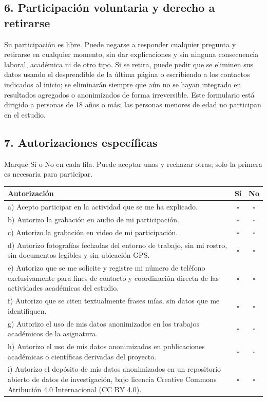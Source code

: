 \subsection*{6. Participación voluntaria y derecho a retirarse}

Su participación es libre. Puede negarse a responder cualquier pregunta y retirarse en cualquier momento, sin dar explicaciones y sin ninguna consecuencia laboral, académica ni de otro tipo. Si se retira, puede pedir que se eliminen sus datos usando el desprendible de la última página o escribiendo a los contactos indicados al inicio; se eliminarán siempre que aún no se hayan integrado en resultados agregados o anonimizados de forma irreversible. Este formulario está dirigido a personas de 18 años o más; las personas menores de edad no participan en el estudio.

\subsection*{7. Autorizaciones específicas}

Marque Sí o No en cada fila. Puede aceptar unas y rechazar otras; solo la primera es necesaria para participar.

\begin{center}
\small
\begin{tabularx}{\textwidth}{|X|c|c|}
\hline
\textbf{Autorización} & \textbf{Sí} & \textbf{No} \\
\hline
a) Acepto participar en la actividad que se me ha explicado. & $\square$ & $\square$ \\ \hline
b) Autorizo la grabación en audio de mi participación. & $\square$ & $\square$ \\ \hline
c) Autorizo la grabación en video de mi participación. & $\square$ & $\square$ \\ \hline
d) Autorizo fotografías fechadas del entorno de trabajo, sin mi rostro, sin documentos legibles y sin ubicación GPS. & $\square$ & $\square$ \\ \hline
e) Autorizo que se me solicite y registre mi número de teléfono exclusivamente para fines de contacto y coordinación directa de las actividades académicas del estudio. & $\square$ & $\square$ \\ \hline
f) Autorizo que se citen textualmente frases mías, sin datos que me identifiquen. & $\square$ & $\square$ \\ \hline
g) Autorizo el uso de mis datos anonimizados en los trabajos académicos de la asignatura. & $\square$ & $\square$ \\ \hline
h) Autorizo el uso de mis datos anonimizados en publicaciones académicas o científicas derivadas del proyecto. & $\square$ & $\square$ \\ \hline
i) Autorizo el depósito de mis datos anonimizados en un repositorio abierto de datos de investigación, bajo licencia Creative Commons Atribución 4.0 Internacional (CC BY 4.0). & $\square$ & $\square$ \\ \hline
\end{tabularx}
\end{center}

